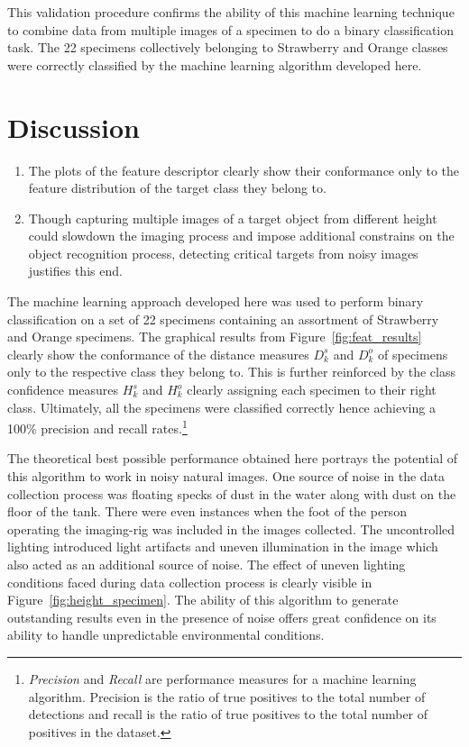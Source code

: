 \documentclass {udthesis}
\begin{document}
This validation procedure confirms the ability of this machine learning technique to combine data from multiple images of a specimen to do a binary classification task. The 22 specimens collectively belonging to Strawberry and Orange classes were correctly classified by the machine learning algorithm developed here.

\section{Discussion}
\begin{enumerate}
	\item The plots of the feature descriptor clearly show their conformance only to the feature distribution of the target class they belong to.
	
	\item Though capturing multiple images of a target object from different height could slowdown the imaging process and impose additional constrains on the object recognition process, detecting critical targets from noisy images justifies this end.
\end{enumerate}

The machine learning approach developed here was used to perform binary classification on a set of 22 specimens containing an assortment of Strawberry and Orange specimens. The graphical results from Figure~\ref{fig:feat_results} clearly show the conformance of the distance measures $D^s_k$ and $D^o_k$ of specimens only to the respective class they belong to. This is further reinforced by the class confidence measures $H^s_k$ and $H^o_k$ clearly assigning each specimen to their right class. Ultimately, all the specimens were classified correctly hence achieving a 100\% precision and recall rates.\footnote{\label{1} \emph{Precision} and \emph{Recall} are performance measures for a machine learning algorithm. Precision is the ratio of true positives to the total number of detections and recall is the ratio of true positives to the total number of positives in the dataset.} 

The theoretical best possible performance obtained here portrays the potential of this algorithm to work in noisy natural images. One source of noise in the data collection process was floating specks of dust in the water along with dust on the floor of the tank. There were even instances when the foot of the person operating the imaging-rig was included in the images collected. The uncontrolled lighting introduced light artifacts and uneven illumination in the image which also acted as an additional source of noise. The effect of uneven lighting conditions faced during data collection process is clearly visible in Figure~\ref{fig:height_specimen}. The ability of this algorithm to generate outstanding results even in the presence of noise offers great confidence on its ability to handle unpredictable environmental conditions.
\end{document}

